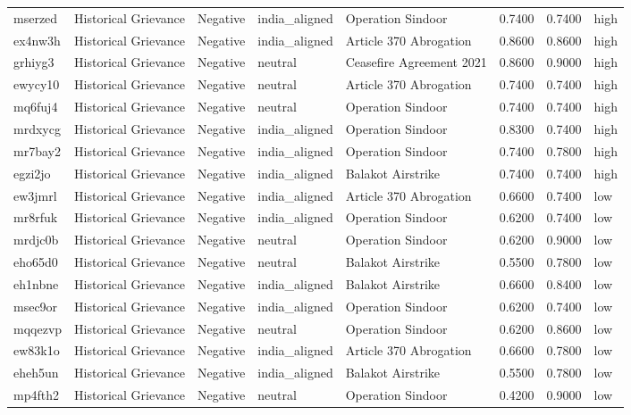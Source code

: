 \begin{longtable}{lllllrrl}
mserzed & Historical Grievance & Negative & india\_aligned & Operation Sindoor & 0.7400 & 0.7400 & high \\
ex4nw3h & Historical Grievance & Negative & india\_aligned & Article 370 Abrogation & 0.8600 & 0.8600 & high \\
grhiyg3 & Historical Grievance & Negative & neutral & Ceasefire Agreement 2021 & 0.8600 & 0.9000 & high \\
ewycy10 & Historical Grievance & Negative & neutral & Article 370 Abrogation & 0.7400 & 0.7400 & high \\
mq6fuj4 & Historical Grievance & Negative & neutral & Operation Sindoor & 0.7400 & 0.7400 & high \\
mrdxycg & Historical Grievance & Negative & india\_aligned & Operation Sindoor & 0.8300 & 0.7400 & high \\
mr7bay2 & Historical Grievance & Negative & india\_aligned & Operation Sindoor & 0.7400 & 0.7800 & high \\
egzi2jo & Historical Grievance & Negative & india\_aligned & Balakot Airstrike & 0.7400 & 0.7400 & high \\
ew3jmrl & Historical Grievance & Negative & india\_aligned & Article 370 Abrogation & 0.6600 & 0.7400 & low \\
mr8rfuk & Historical Grievance & Negative & india\_aligned & Operation Sindoor & 0.6200 & 0.7400 & low \\
mrdjc0b & Historical Grievance & Negative & neutral & Operation Sindoor & 0.6200 & 0.9000 & low \\
eho65d0 & Historical Grievance & Negative & neutral & Balakot Airstrike & 0.5500 & 0.7800 & low \\
eh1nbne & Historical Grievance & Negative & india\_aligned & Balakot Airstrike & 0.6600 & 0.8400 & low \\
msec9or & Historical Grievance & Negative & india\_aligned & Operation Sindoor & 0.6200 & 0.7400 & low \\
mqqezvp & Historical Grievance & Negative & neutral & Operation Sindoor & 0.6200 & 0.8600 & low \\
ew83k1o & Historical Grievance & Negative & india\_aligned & Article 370 Abrogation & 0.6600 & 0.7800 & low \\
eheh5un & Historical Grievance & Negative & india\_aligned & Balakot Airstrike & 0.5500 & 0.7800 & low \\
mp4fth2 & Historical Grievance & Negative & neutral & Operation Sindoor & 0.4200 & 0.9000 & low \\

\end{longtable}

